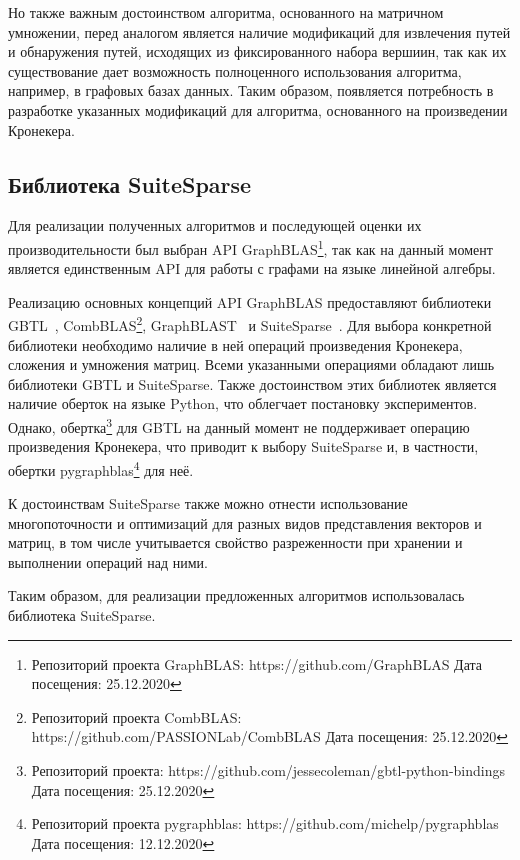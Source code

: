 Но также важным достоинством алгоритма, основанного на матричном умножении, перед аналогом является наличие модификаций для извлечения путей и обнаружения путей, исходящих из фиксированного набора вершиин, так как их существование дает возможность полноценного использования алгоритма, например, в графовых базах данных. Таким образом, появляется потребность в разработке указанных модификаций для алгоритма, основанного на произведении Кронекера.




\subsection{Библиотека SuiteSparse}

Для реализации полученных алгоритмов и последующей оценки их производительности был выбран API GraphBLAS\footnote{Репозиторий проекта GraphBLAS: https://github.com/GraphBLAS Дата посещения: 25.12.2020}, так как на данный момент является единственным API для работы с графами на языке линейной алгебры.

Реализацию основных концепций API GraphBLAS предоставляют библиотеки GBTL~\cite{doi:10.1177/1094342011403516}, CombBLAS\footnote{Репозиторий проекта CombBLAS: https://github.com/PASSIONLab/CombBLAS Дата посещения: 25.12.2020}, GraphBLAST~\cite{yang2020graphblast} и SuiteSparse~\cite{8916550}. Для выбора конкретной библиотеки необходимо наличие в ней операций произведения Кронекера, сложения и умножения матриц. Всеми указанными операциями обладают лишь библиотеки GBTL и SuiteSparse. Также достоинством этих библиотек является наличие оберток на языке Python, что облегчает постановку экспериментов. Однако, обертка\footnote{Репозиторий проекта: https://github.com/jessecoleman/gbtl-python-bindings Дата посещения: 25.12.2020} для GBTL на данный момент не поддерживает операцию произведения Кронекера, что приводит к выбору SuiteSparse и, в частности, обертки pygraphblas\footnote{Репозиторий проекта pygraphblas: https://github.com/michelp/pygraphblas Дата посещения: 12.12.2020} для неё.

К достоинствам SuiteSparse также можно отнести использование многопоточности и оптимизаций для разных видов представления векторов и матриц, в том числе учитывается свойство разреженности при хранении и выполнении операций над ними.

Таким образом, для реализации предложенных алгоритмов использовалась библиотека SuiteSparse.